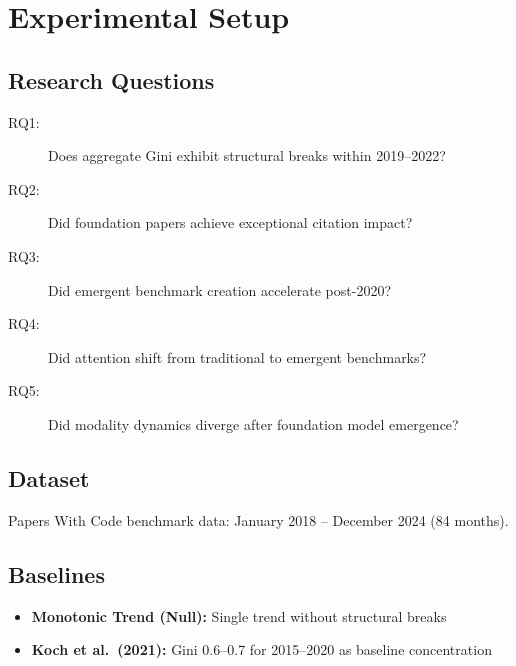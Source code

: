 \section{Experimental Setup}
\label{sec:experiments}

\subsection{Research Questions}

\begin{description}
    \item[RQ1:] Does aggregate Gini exhibit structural breaks within 2019--2022?
    \item[RQ2:] Did foundation papers achieve exceptional citation impact?
    \item[RQ3:] Did emergent benchmark creation accelerate post-2020?
    \item[RQ4:] Did attention shift from traditional to emergent benchmarks?
    \item[RQ5:] Did modality dynamics diverge after foundation model emergence?
\end{description}

\subsection{Dataset}

Papers With Code benchmark data: January 2018 -- December 2024 (84 months).

\subsection{Baselines}

\begin{itemize}
    \item \textbf{Monotonic Trend (Null):} Single trend without structural breaks
    \item \textbf{Koch et al.\ (2021):} Gini 0.6--0.7 for 2015--2020 as baseline concentration
\end{itemize}
